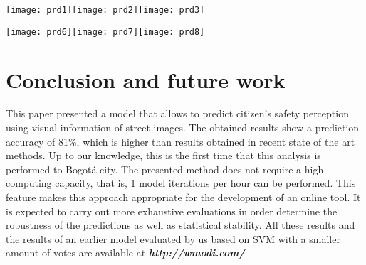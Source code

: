 \documentclass{llncs}
\begin{document}
\begin{center}
	\centering
	\texttt{[image: prd1]}\hspace{1mm}\texttt{[image: prd2]}\hspace{1mm}\texttt{[image: prd3]}
	\label{fig:zone_martirespre}
\end{center}

\begin{center}
	\centering
	\texttt{[image: prd6]}\hspace{1mm}\texttt{[image: prd7]}\hspace{1mm}\texttt{[image: prd8]}
	\label{fig:zone_usaquenpre}
\end{center}

\section{Conclusion and future work}
This paper presented a model that allows to predict citizen's safety perception using visual information of street images. The obtained results show a prediction accuracy of 81\%, which is higher than results obtained in recent state of the art methods. Up to our knowledge, this is the first time that this analysis is performed to Bogotá city. The presented method does not require a high computing capacity, that is, 1 model iterations per hour can be performed. This feature makes this approach appropriate for the development of an online tool. It is expected to carry out more exhaustive evaluations in order determine the robustness of the predictions as well as statistical stability. All these results and the results of an earlier model evaluated by us based on SVM with a smaller amount of votes are available at \textbf{\textit{http://wmodi.com/}}

       


\end{document}
